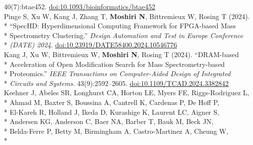 \documentclass[margin,line]{res}
\begin{document}
\begin{resume}
\hspace*{8mm} 40(7):btae452. \href{https://doi.org/10.1093/bioinformatics/btae452}{doi:10.1093/bioinformatics/btae452}\\
\hspace*{4mm} Pinge S, Xu W, Kang J, Zhang T, \textbf{Moshiri N}, Bittremieux W, Rosing T (2024).\\*
\hspace*{9mm} ``SpecHD: Hyperdimensional Computing Framework for FPGA-based Mass\\*
\hspace*{9mm} Spectrometry Clustering.'' \textit{Design Automation and Test in Europe Conference}\\*\vspace{2mm}
\hspace*{8mm} \textit{(DATE) 2024}. \href{https://doi.org/10.23919/DATE58400.2024.10546776}{doi:10.23919/DATE58400.2024.10546776}\\
\hspace*{4mm} Kang J, Xu W, Bittremieux W, \textbf{Moshiri N}, Rosing T (2024). ``DRAM-based\\*
\hspace*{9mm} Acceleration of Open Modification Search for Mass Spectrometry-based\\*
\hspace*{9mm} Proteomics.'' \textit{IEEE Transactions on Computer-Aided Design of Integrated}\\*\vspace{2mm}
\hspace*{8mm} \textit{Circuits and Systems}. 43(9):2592--2605. \href{https://doi.org/10.1109/TCAD.2024.3382842}{doi:10.1109/TCAD.2024.3382842}\\
\hspace*{4mm} Keehner J, Abeles SR, Longhurst CA, Horton LE, Myers FE, Riggs-Rodriguez L,\\*
\hspace*{9mm} Ahmad M, Baxter S, Boussina A, Cantrell K, Cardenas P, De Hoff P,\\*
\hspace*{9mm} El-Kareh R, Holland J, Ikeda D, Kurashige K, Laurent LC, Aigner S,\\*
\hspace*{9mm} Andersen KG, Anderson C, Baer NA, Barber T, Bauk M, Beck JN,\\*
\hspace*{9mm} Belda-Ferre P, Betty M, Birmingham A, Castro-Martinez A, Cheung W,\\*

\end{resume}
\end{document}
